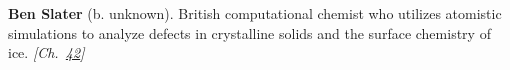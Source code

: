 \textbf{Ben Slater} (b. unknown). British computational chemist who utilizes atomistic simulations to analyze defects in crystalline solids and the surface chemistry of ice. \emph{[Ch.~\hyperref[ch:iceslipperiness]{42}]}

